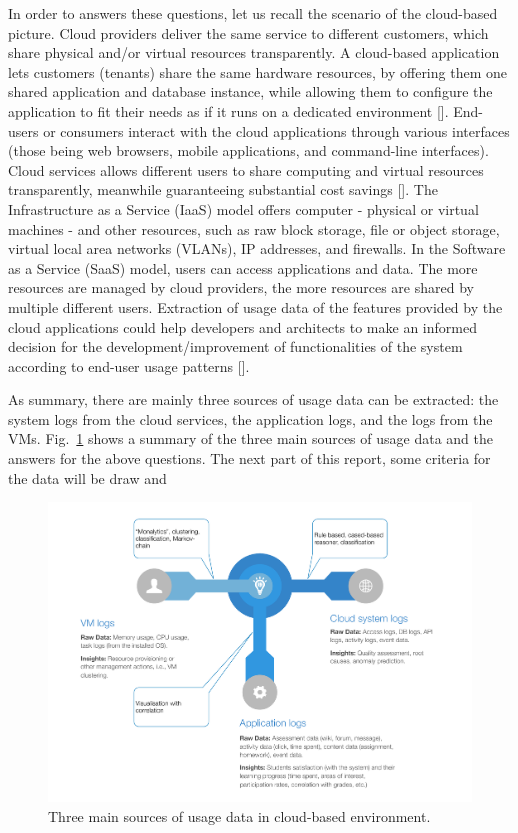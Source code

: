 \documentclass{llncs}
\begin{document}
In order to answers these questions, let us recall the scenario of the cloud-based picture. Cloud providers deliver the same service to different customers, which share physical and/or virtual resources transparently. A cloud-based application lets customers (tenants) share the same hardware resources, by offering them one shared application and database instance, while allowing them to configure the application to fit their needs as if it runs on a dedicated environment []. End-users or consumers interact with the cloud applications through various interfaces (those being web browsers, mobile applications, and command-line interfaces). Cloud services allows different users to share computing and virtual resources transparently, meanwhile guaranteeing substantial cost savings []. The Infrastructure as a Service (IaaS) model offers computer - physical or virtual machines - and other resources, such as raw block storage, file or object storage, virtual local area networks (VLANs), IP addresses, and firewalls. In the Software as a Service (SaaS) model, users can access applications and data. The more resources are managed by cloud providers, the more resources are shared by multiple different users. Extraction of usage data of the features provided by the cloud applications could help developers and architects to make an informed decision for the development/improvement of functionalities of the system according to end-user usage patterns []. 

As summary, there are mainly three sources of usage data can be extracted: the system logs from the cloud services, the application logs, and the logs from the VMs. Fig.~\ref{fig:schema} shows a summary of the three main sources of usage data and the answers for the above questions. The next part of this report, some criteria for the data will be draw and 


\begin{figure}[t!]
	\centering
	\includegraphics[width=\linewidth]{summary}
	\caption{Three main sources of usage data in cloud-based environment.}
	\label{fig:schema}
\end{figure}
\end{document}
